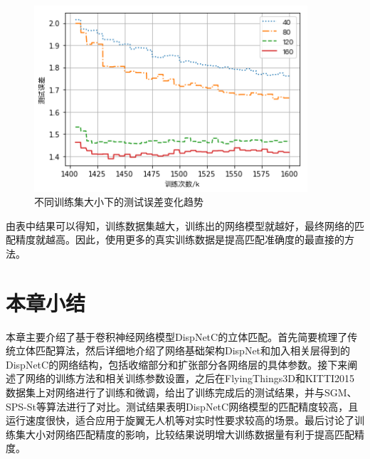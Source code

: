 \vspace{1in}

\begin{figure}[!htb]
	\centering\includegraphics[width=4in]{figures/4_3_kitti_dataset_size}
	\caption{不同训练集大小下的测试误差变化趋势}\label{fig:4_3_kitti_dataset_size}
\end{figure}


由表中结果可以得知，训练数据集越大，训练出的网络模型就越好，最终网络的匹配精度就越高。因此，使用更多的真实训练数据是提高匹配准确度的最直接的方法。


\section{本章小结}
本章主要介绍了基于卷积神经网络模型DispNetC的立体匹配。首先简要梳理了传统立体匹配算法，然后详细地介绍了网络基础架构DispNet和加入相关层得到的DispNetC的网络结构，包括收缩部分和扩张部分各网络层的具体参数。接下来阐述了网络的训练方法和相关训练参数设置，之后在FlyingThings3D和KITTI2015数据集上对网络进行了训练和微调，给出了训练完成后的测试结果，并与SGM、SPS-St等算法进行了对比。测试结果表明DispNetC网络模型的匹配精度较高，且运行速度很快，适合应用于旋翼无人机等对实时性要求较高的场景。最后讨论了训练集大小对网络匹配精度的影响，比较结果说明增大训练数据量有利于提高匹配精度。







